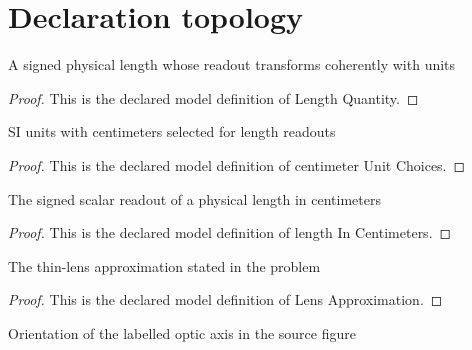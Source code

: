 \section{Declaration topology}
\begin{definition}
  \label{def:physics:phyx-mini-0109:phyxminiproblems-problemphyxmini0109-lengthquantity}
  A signed physical length whose readout transforms coherently with units
\end{definition}
\begin{proof}
  This is the declared model definition of Length Quantity.
\end{proof}
\begin{definition}
  \label{def:physics:phyx-mini-0109:phyxminiproblems-problemphyxmini0109-centimeterunitchoices}
  SI units with centimeters selected for length readouts
\end{definition}
\begin{proof}
  This is the declared model definition of centimeter Unit Choices.
\end{proof}
\begin{definition}
  \label{def:physics:phyx-mini-0109:phyxminiproblems-problemphyxmini0109-lengthincentimeters}
  The signed scalar readout of a physical length in centimeters
\end{definition}
\begin{proof}
  This is the declared model definition of length In Centimeters.
\end{proof}
\begin{definition}
  \label{def:physics:phyx-mini-0109:phyxminiproblems-problemphyxmini0109-lensapproximation}
  The thin-lens approximation stated in the problem
\end{definition}
\begin{proof}
  This is the declared model definition of Lens Approximation.
\end{proof}
\begin{definition}
  \label{def:physics:phyx-mini-0109:phyxminiproblems-problemphyxmini0109-opticaxisorientation}
  Orientation of the labelled optic axis in the source figure
\end{definition}
